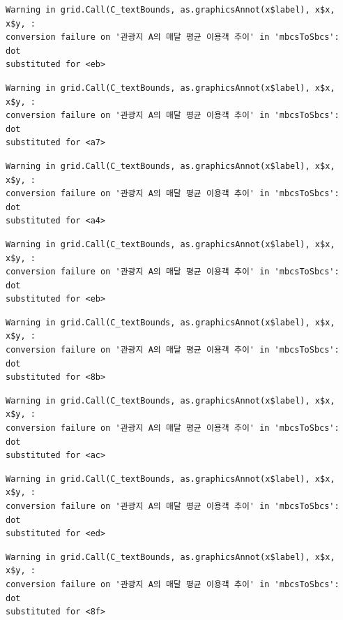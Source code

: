 \documentclass[
  letterpaper,
  DIV=11,
  numbers=noendperiod]{scrreprt}
\begin{document}
\begin{verbatim}
Warning in grid.Call(C_textBounds, as.graphicsAnnot(x$label), x$x, x$y, :
conversion failure on '관광지 A의 매달 평균 이용객 추이' in 'mbcsToSbcs': dot
substituted for <eb>
\end{verbatim}

\begin{verbatim}
Warning in grid.Call(C_textBounds, as.graphicsAnnot(x$label), x$x, x$y, :
conversion failure on '관광지 A의 매달 평균 이용객 추이' in 'mbcsToSbcs': dot
substituted for <a7>
\end{verbatim}

\begin{verbatim}
Warning in grid.Call(C_textBounds, as.graphicsAnnot(x$label), x$x, x$y, :
conversion failure on '관광지 A의 매달 평균 이용객 추이' in 'mbcsToSbcs': dot
substituted for <a4>
\end{verbatim}

\begin{verbatim}
Warning in grid.Call(C_textBounds, as.graphicsAnnot(x$label), x$x, x$y, :
conversion failure on '관광지 A의 매달 평균 이용객 추이' in 'mbcsToSbcs': dot
substituted for <eb>
\end{verbatim}

\begin{verbatim}
Warning in grid.Call(C_textBounds, as.graphicsAnnot(x$label), x$x, x$y, :
conversion failure on '관광지 A의 매달 평균 이용객 추이' in 'mbcsToSbcs': dot
substituted for <8b>
\end{verbatim}

\begin{verbatim}
Warning in grid.Call(C_textBounds, as.graphicsAnnot(x$label), x$x, x$y, :
conversion failure on '관광지 A의 매달 평균 이용객 추이' in 'mbcsToSbcs': dot
substituted for <ac>
\end{verbatim}

\begin{verbatim}
Warning in grid.Call(C_textBounds, as.graphicsAnnot(x$label), x$x, x$y, :
conversion failure on '관광지 A의 매달 평균 이용객 추이' in 'mbcsToSbcs': dot
substituted for <ed>
\end{verbatim}

\begin{verbatim}
Warning in grid.Call(C_textBounds, as.graphicsAnnot(x$label), x$x, x$y, :
conversion failure on '관광지 A의 매달 평균 이용객 추이' in 'mbcsToSbcs': dot
substituted for <8f>
\end{verbatim}
\end{document}
